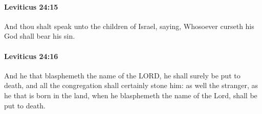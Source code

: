 		\paragraph{Leviticus 24:15} %
			\label{LEVITICUS-24-15}

			And thou shalt speak unto the children of Israel, saying, Whosoever curseth his God shall bear his sin.


		\paragraph{Leviticus 24:16} %
			\label{LEVITICUS-24-16}

			And he that blasphemeth the name of the LORD, he shall surely be put to death, and all the congregation shall certainly stone him: as well the stranger, as he that is born in the land, when he blasphemeth the name of the Lord, shall be put to death.



